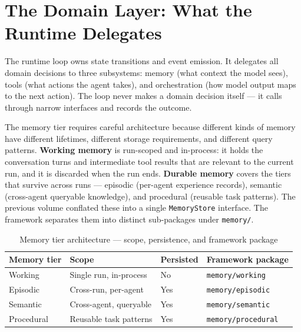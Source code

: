 

\section{The Domain Layer: What the Runtime Delegates}
\label{sec:domain-layer}

The runtime loop owns state transitions and event emission.
It delegates all domain decisions to three subsystems: memory (what context the
model sees), tools (what actions the agent takes), and orchestration (how model
output maps to the next action).
The loop never makes a domain decision itself — it calls through narrow interfaces
and records the outcome.

The memory tier requires careful architecture because different kinds of memory have
different lifetimes, different storage requirements, and different query patterns.
\textbf{Working memory} is run-scoped and in-process: it holds the conversation
turns and intermediate tool results that are relevant to the current run, and it
is discarded when the run ends.
\textbf{Durable memory} covers the tiers that survive across runs — episodic
(per-agent experience records), semantic (cross-agent queryable knowledge), and
procedural (reusable task patterns).
The previous volume conflated these into a single \texttt{MemoryStore} interface.
The framework separates them into distinct sub-packages under \texttt{memory/}.

\begin{table}[h]
\centering
\caption{Memory tier architecture — scope, persistence, and framework package}
\label{tab:memory-tiers}
\begin{tabular}{llll}
\toprule
\textbf{Memory tier} & \textbf{Scope} & \textbf{Persisted} & \textbf{Framework package} \\
\midrule
Working    & Single run, in-process & No  & \texttt{memory/working} \\
Episodic   & Cross-run, per-agent   & Yes & \texttt{memory/episodic} \\
Semantic   & Cross-agent, queryable & Yes & \texttt{memory/semantic} \\
Procedural & Reusable task patterns & Yes & \texttt{memory/procedural} \\
\bottomrule
\end{tabular}
\end{table}

